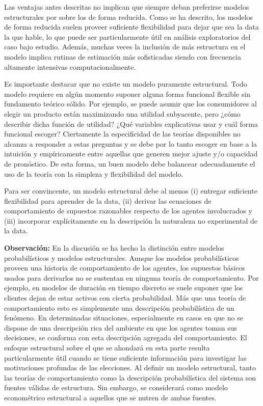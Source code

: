 \documentclass[
]{book}
\begin{document}
Las ventajas antes descritas no implican que siempre deban preferirse modelos estructurales por sobre los de forma reducida. Como se ha descrito, los modelos de forma reducida suelen proveer suficiente flexibilidad para dejar que sea la data la que hable, lo que puede ser particularmente útil en análisis exploratorios del caso bajo estudio. Además, muchas veces la inclusión de más estructura en el modelo implica rutinas de estimación más sofisticadas siendo con frecuencia altamente intensivas computacionalmente.

Es importante destacar que no existe un modelo puramente estructural. Todo modelo requiere en algún momento suponer alguna forma funcional flexible sin fundamento teórico sólido. Por ejemplo, se puede asumir que los consumidores al elegir un producto están maximizando una utilidad subyacente, pero ¿cómo describir dicha función de utilidad? ¿Qué variables explicativas usar y cuál forma funcional escoger? Ciertamente la especificidad de las teorías disponibles no alcanza a responder a estas preguntas y se debe por lo tanto escoger en base a la intuición y empíricamente entre aquellas que generen mejor ajuste y/o capacidad de pronóstico. De esta forma, un buen modelo debe balancear adecuadamente el uso de la teoría con la simpleza y flexibilidad del modelo.

Para ser convincente, un modelo estructural debe al menos (i) entregar suficiente flexibilidad para aprender de la data, (ii) derivar las ecuaciones de comportamiento de supuestos razonables respecto de los agentes involucrados y (iii) incorporar explícitamente en la descripción la naturaleza no experimental de la data.

\textbf{Observación:} En la discusión se ha hecho la distinción entre modelos probabilísticos y modelos estructurales. Aunque los modelos probabilísticos proveen una historia de comportamiento de los agentes, los supuestos básicos usados para derivarlos no se sustentan en ninguna teoría de comportamiento. Por ejemplo, en modelos de duración en tiempo discreto se suele suponer que los clientes dejan de estar activos con cierta probabilidad. Más que una teoría de comportamiento esto es simplemente una descripción probabilística de un fenómeno. En determinadas situaciones, especialmente en casos en que no se dispone de una descripción rica del ambiente en que los agentes toman sus decisiones, se conforma con esta descripción agregada del comportamiento. El enfoque estructural sobre el que se ahondará en esta parte resulta particularmente útil cuando se tiene suficiente información para investigar las motivaciones profundas de las elecciones. Al definir un modelo estructural, tanto las teorías de comportamiento como la descripción probabilística del sistema son fuentes válidas de estructura. Sin embargo, se considerará como modelo econométrico estructural a aquellos que se nutren de ambas fuentes.
\end{document}
